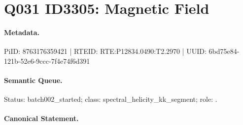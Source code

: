 \section*{Q031 ID3305: Magnetic Field}
\paragraph{Metadata.}
PiID: 8763176359421 | RTEID: RTE:P12834.0490:T2.2970 | UUID: 6bd75e84-121b-52e6-9ccc-7f4e74f6d391

\paragraph{Semantic Queue.}
Status: batch002\_started; class: spectral\_helicity\_kk\_segment; role: .

\paragraph{Canonical Statement.}
